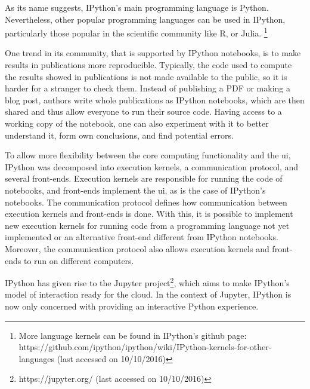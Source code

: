 As its name suggests, IPython's main programming language is Python.
Nevertheless, other popular programming languages can be used in IPython, particularly those popular in the scientific community like R, or Julia.%
\footnote{More language kernels can be found in IPython's github page: https://github.com/ipython/ipython/wiki/IPython-kernels-for-other-languages (last accessed on 10/10/2016)}

One trend in its community, that is supported by IPython notebooks, is to make results in publications more reproducible.
Typically, the code used to compute the results showed in publications is not made available to the public, so it is harder for a stranger to check them.
Instead of publishing a PDF or making a blog post, authors write whole publications as IPython notebooks, which are then shared and thus allow everyone to run their source code.
Having access to a working copy of the notebook, one can also experiment with it to better understand it, form own conclusions, and find potential errors.

To allow more flexibility between the core computing functionality and the \gls{ui}, IPython was decomposed into execution kernels, a communication protocol, and several front-ends.
Execution kernels are responsible for running the code of notebooks, and front-ends implement the \gls{ui}, as is the case of IPython's notebooks.
The communication protocol defines how communication between execution kernels and front-ends is done.
With this, it is possible to implement new execution kernels for running code from a programming language not yet implemented or an alternative front-end different from IPython notebooks.
Moreover, the communication protocol also allows execution kernels and front-ends to run on different computers\cite{PER-GRA:2007}.

IPython has given rise to the Jupyter project\footnote{https://jupyter.org/ (last accessed on 10/10/2016)}, which aims to make IPython's model of interaction ready for the cloud.
In the context of Jupyter, IPython is now only concerned with providing an interactive Python experience.

